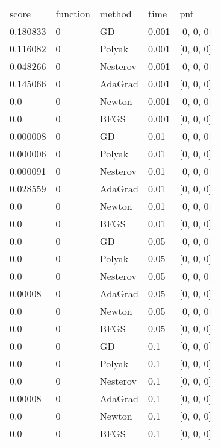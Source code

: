 \begin{tabular}{lllll}
    score & function &   method &   time &              pnt \\
 0.180833 &        0 &       GD &  0.001 &        [0, 0, 0] \\
 0.116082 &        0 &   Polyak &  0.001 &        [0, 0, 0] \\
 0.048266 &        0 & Nesterov &  0.001 &        [0, 0, 0] \\
 0.145066 &        0 &  AdaGrad &  0.001 &        [0, 0, 0] \\
      0.0 &        0 &   Newton &  0.001 &        [0, 0, 0] \\
      0.0 &        0 &     BFGS &  0.001 &        [0, 0, 0] \\
 0.000008 &        0 &       GD &   0.01 &        [0, 0, 0] \\
 0.000006 &        0 &   Polyak &   0.01 &        [0, 0, 0] \\
 0.000091 &        0 & Nesterov &   0.01 &        [0, 0, 0] \\
 0.028559 &        0 &  AdaGrad &   0.01 &        [0, 0, 0] \\
      0.0 &        0 &   Newton &   0.01 &        [0, 0, 0] \\
      0.0 &        0 &     BFGS &   0.01 &        [0, 0, 0] \\
      0.0 &        0 &       GD &   0.05 &        [0, 0, 0] \\
      0.0 &        0 &   Polyak &   0.05 &        [0, 0, 0] \\
      0.0 &        0 & Nesterov &   0.05 &        [0, 0, 0] \\
  0.00008 &        0 &  AdaGrad &   0.05 &        [0, 0, 0] \\
      0.0 &        0 &   Newton &   0.05 &        [0, 0, 0] \\
      0.0 &        0 &     BFGS &   0.05 &        [0, 0, 0] \\
      0.0 &        0 &       GD &    0.1 &        [0, 0, 0] \\
      0.0 &        0 &   Polyak &    0.1 &        [0, 0, 0] \\
      0.0 &        0 & Nesterov &    0.1 &        [0, 0, 0] \\
  0.00008 &        0 &  AdaGrad &    0.1 &        [0, 0, 0] \\
      0.0 &        0 &   Newton &    0.1 &        [0, 0, 0] \\
      0.0 &        0 &     BFGS &    0.1 &        [0, 0, 0] \\

\end{tabular}
